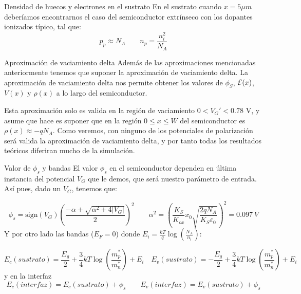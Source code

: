 \documentclass{/home/daniel/GitHub/USC-Physics-Degree-Notes/Notes/Presentacion}
\begin{document}
\begin{frame}{Densidad de huecos y electrones en el sustrato}
    En el sustrato cuando $x=5\mu m$ deberíamos encontrarnos el caso del semiconductor extrínseco con los dopantes ionizados típico, tal que: 
    \begin{equation}
        p_p \approx N_A \qquad n_p = \frac{n_i^2}{N_A}
    \end{equation}
\end{frame}

\begin{frame}{Aproximación de vaciamiento delta}
    Además de las aproximaciones mencionadas anteriormente tenemos que suponer la aproximación de vaciamiento delta. La aproximación de vaciamiento delta nos permite obtener los valores de $\phi_S$, $\mathcal{E}(x)$, $V(x)$ y $\rho(x)$ a lo largo del semiconductor. 

    \hspace*{1em}

    Esta aproximación solo es valida en la región de vaciamiento $0<V_G'<0.78$ V, y asume que hace es suponer que en la región $0\leq x \leq W$ del semiconductor es $\rho(x) \approx -qN_A$. Como veremos, con ninguno de los potenciales de polarización será valida la aproximación de vaciamiento delta, y por tanto todas los resultados teóricos diferiran mucho de la simulación. 
\end{frame}
\begin{frame}{Valor de $\phi_s$ y bandas}
    El valor $\phi_s$ en el semiconductor dependen en última instancia del potencial $V_G$ que le demos, que será nuestro parámetro de entrada. Así pues, dado un $V_G$, tenemos que:

    \begin{equation*}
        \phi_s = \text{sign}(V_G) \left( \frac{-\alpha+ \sqrt{\alpha^2 + 4|V_G|}}{2} \right)^2 \qquad \alpha^2 =  \left(\frac{K_S}{K_{ox}} x_0 \sqrt{\frac{2qN_A}{K_S\varepsilon_0}}  \right)^2=  0.097 \ \unit{V}
    \end{equation*}
    Y por otro lado las bandas ($E_F=0$) donde $E_i=\frac{kT}{q}\log \left(\frac{N_A}{n_i}\right)$:

    \begin{equation*}
        E_c (sustrato) = \frac{E_g}{2} + \frac{3}{4} kT \log\left(\frac{m_p^*}{m_n^*}\right) + E_i \quad 
        E_v (sustrato) = - \frac{E_g}{2} + \frac{3}{4} kT \log\left(\frac{m_p^*}{m_n^*}\right) + E_i
    \end{equation*} 
    y en la interfaz
    \begin{equation*}
        E_c (interfaz) = E_c (sustrato) + \phi_s  \qquad
        E_v (interfaz) = E_v (sustrato) + \phi_s
    \end{equation*}

\end{frame}
\end{document}
